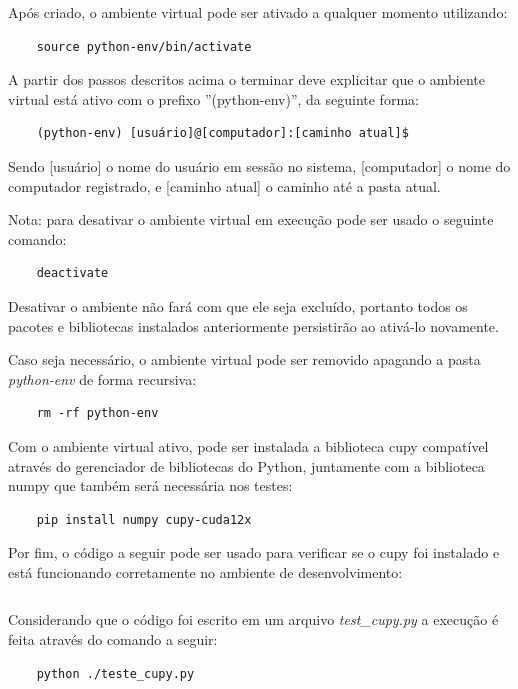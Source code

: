 \documentclass[
    12pt,
    openright,
    oneside,
    a4paper,
    english,
    brazil,
]{abntex2}
\begin{document}
Após criado, o ambiente virtual pode ser ativado a qualquer momento utilizando:

\begin{verbatim}
    source python-env/bin/activate
\end{verbatim}

A partir dos passos descritos acima o terminar deve explicitar que o ambiente virtual está ativo com o prefixo ''(python-env)'', da seguinte forma:

\begin{verbatim}
    (python-env) [usuário]@[computador]:[caminho atual]$
\end{verbatim}

Sendo [usuário] o nome do usuário em sessão no sistema, [computador] o nome do computador registrado, e [caminho atual] o caminho até a pasta atual.

Nota: para desativar o ambiente virtual em execução pode ser usado o seguinte comando:

\begin{verbatim}
    deactivate
\end{verbatim}

Desativar o ambiente não fará com que ele seja excluído, portanto todos os pacotes e bibliotecas instalados anteriormente persistirão ao ativá-lo novamente.

Caso seja necessário, o ambiente virtual pode ser removido apagando a pasta \emph{python-env} de forma recursiva:

\begin{verbatim}
    rm -rf python-env
\end{verbatim}

Com o ambiente virtual ativo, pode ser instalada a biblioteca cupy compatível através do gerenciador de bibliotecas do Python, juntamente com a biblioteca numpy que também será necessária nos testes:

\begin{verbatim}
    pip install numpy cupy-cuda12x
\end{verbatim}

Por fim, o código a seguir pode ser usado para verificar se o cupy foi instalado e está funcionando corretamente no ambiente de desenvolvimento:

\inputminted{python}{cfd_on_gpu/teste_cupy.py}

Considerando que o código foi escrito em um arquivo \emph{test\_cupy.py} a execução é feita através do comando a seguir:

\begin{verbatim}
    python ./teste_cupy.py
\end{verbatim}
\end{document}
